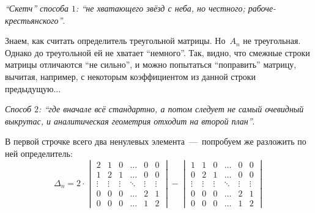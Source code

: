 \documentclass[a4paper,12pt]{article}
\theoremstyle{remark}
\begin{document}
  \begin{solution}
    \leavevmode
    
    \emph{``Скетч'' способа $1$: ``не хватающего звёзд с неба, но честного; рабоче-крестьянского''}.
    
    Знаем, как считать определитель треугольной матрицы.
    Но~$A_n$ не треугольная.
    Однако до треугольной ей не хватает ``немного''.
    Так, видно, что смежные строки матрицы отличаются ``не сильно'', и можно попытаться ``поправить'' матрицу, вычитая, например, с некоторым коэффициентом из данной строки предыдущую...
    
    \medskip
    
    \emph{Способ $2$: ``где вначале всё стандартно, а потом следует не самый очевидный выкрутас, и аналитическая геометрия отходит на второй план''}.
    
    В первой строчке всего два ненулевых элемента~---~попробуем же разложить по ней определитель:
    \[
      \Delta_n
      = 2 \cdot \begin{vmatrix}
        2      & 1      & 0      & \ldots & 0      & 0\\
        1      & 2      & 1      & \ldots & 0      & 0\\
        \vdots & \vdots & \vdots & \ddots & \vdots & \vdots\\
        0      & 0      & 0      & \ldots & 2      & 1\\
        0      & 0      & 0      & \ldots & 1      & 2
      \end{vmatrix} - \begin{vmatrix}
        1      & 1      & 0      & \ldots & 0      & 0\\
        0      & 2      & 1      & \ldots & 0      & 0\\
        \vdots & \vdots & \vdots & \ddots & \vdots & \vdots\\
        0      & 0      & 0      & \ldots & 2      & 1\\
        0      & 0      & 0      & \ldots & 1      & 2
      \end{vmatrix}
    \]
    

\end{solution}
\end{document}

